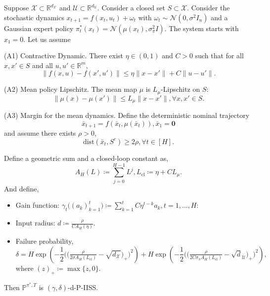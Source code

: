 \documentclass{article}
\begin{document}
\begin{proposition}\label{prop:piiss_gaussian_exploration}Suppose $\mathcal X \subset \mathbb R^{d_{\mathcal X}}$ and $\mathcal U \subset \mathbb R^{d_{\mathcal U}}$.
Consider a closed set $S\subset\mathcal X$. Consider the stochastic dynamics $x_{t+1}=f(x_t,u_t)+\omega_t$ with $ \omega_t\sim \mathcal N(0,\sigma^2 I_n)$ and a Gaussian expert policy $\pi^*_t(x_t)= \mathcal N(\mu(x_t), \sigma_{\pi}^2I)$. The system starts with $x_1=0$. Let us assume

\textnormal{(A1) Contractive Dynamic.} There exist $\eta\in(0,1)$ and $C>0$ such that for all $x,x'\in S$ and all $u,u'\in\mathbb R^m$,
\begin{equation*}
\|f(x,u)-f(x',u')\|\le \eta\|x-x'\|+C\|u-u'\|.
\end{equation*}

\textnormal{(A2) Mean policy Lipschitz.} The mean map $\mu$ is $L_\mu$-Lipschitz on $S$:
\begin{equation*}
\|\mu(x)-\mu(x')\|\le L_\mu\|x-x'\|,\forall x,x'\in S.
\end{equation*}

\textnormal{(A3)  Margin for the mean dynamics.} Define the deterministic nominal trajectory
\begin{equation*}
\bar x_{t+1}=f(\bar x_t,\mu(\bar x_t)), \bar x_1=\bm 0
\end{equation*}
and assume there exists $\rho>0$,
\begin{equation*}
\mathrm{dist}(\bar x_t,S^c)\ge 2\rho,\forall t\in [H].
\end{equation*}

\smallskip
Define a geometric sum and a closed-loop constant as,
\begin{equation*}
A_H(L)\coloneqq \sum_{j=0}^{H-1}L^j,L_{\mathrm{cl}}\coloneqq \eta+C L_\mu.
\end{equation*}
And define,
\begin{itemize}
\item Gain function: $ \gamma_t\big((a_k)_{k=1}^t\big)\coloneqq \sum_{k=1}^t C\eta^{t-k}a_k, t=1,\ldots, H$:
\item Input radius: $d\coloneqq \frac{\rho}{CA_H(\eta)}.$
\item Failure probability,
\begin{equation*}
\delta =
H\exp\left(
-\frac12\Big(\big(\tfrac{\rho}{2\sigma A_H(L_{\mathrm{cl}})}-\sqrt {d_{\mathcal X}}\big)_+\Big)^2
\right)
+
H\exp\left(
-\frac12\Big(\big(\tfrac{\rho}{2C\sigma_\pi A_H(L_{\mathrm{cl}})}-\sqrt d_{\mathcal U}\big)_+\Big)^2
\right),
\end{equation*}
where $(z)_+\coloneqq \max\{z,0\}$.
\end{itemize}
Then $\mathbb P^{\pi^*,T}$ is $(\gamma, \delta)$-d-P-IISS.
\end{proposition}
\end{document}
